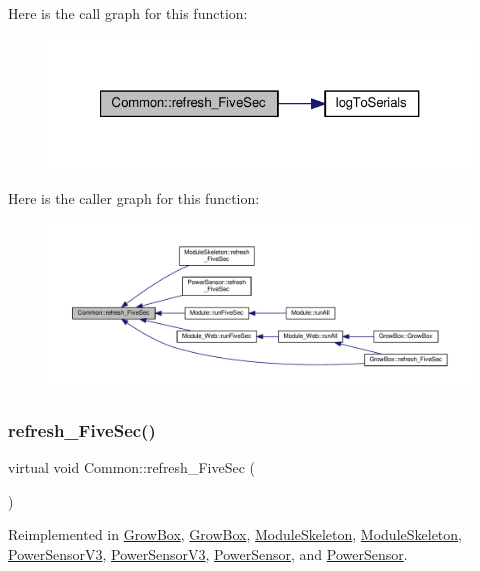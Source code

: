 Here is the call graph for this function\+:
\nopagebreak
\begin{figure}[H]
\begin{center}
\leavevmode
\includegraphics[width=321pt]{class_common_a604ab36b3a1d9a5bcfcb225149c82f90_cgraph}
\end{center}
\end{figure}
Here is the caller graph for this function\+:
\nopagebreak
\begin{figure}[H]
\begin{center}
\leavevmode
\includegraphics[width=350pt]{class_common_a604ab36b3a1d9a5bcfcb225149c82f90_icgraph}
\end{center}
\end{figure}
\mbox{\label{class_common_adeb42683b28c16201527f5e2f4083922}} 
\subsubsection{\texorpdfstring{refresh\+\_\+\+Five\+Sec()}{refresh\_FiveSec()}\hspace{0.1cm}{\footnotesize\ttfamily [2/2]}}
{\footnotesize\ttfamily virtual void Common\+::refresh\+\_\+\+Five\+Sec (\begin{DoxyParamCaption}{ }\end{DoxyParamCaption})\hspace{0.3cm}{\ttfamily [virtual]}}



Reimplemented in \hyperlink{class_grow_box_ad3c74a1bbf508489f113215d1f4ae43f}{Grow\+Box}, \hyperlink{class_grow_box_ad3c74a1bbf508489f113215d1f4ae43f}{Grow\+Box}, \hyperlink{class_module_skeleton_a5c9845eec6ca7fbaac1521f4b021712a}{Module\+Skeleton}, \hyperlink{class_module_skeleton_a5c9845eec6ca7fbaac1521f4b021712a}{Module\+Skeleton}, \hyperlink{class_power_sensor_v3_a1bf23a2cfa924933a5e265dc3a337ec4}{Power\+Sensor\+V3}, \hyperlink{class_power_sensor_v3_a1bf23a2cfa924933a5e265dc3a337ec4}{Power\+Sensor\+V3}, \hyperlink{class_power_sensor_a429859d5aa4b72bac2002cda95ac5b21}{Power\+Sensor}, and \hyperlink{class_power_sensor_a429859d5aa4b72bac2002cda95ac5b21}{Power\+Sensor}.

